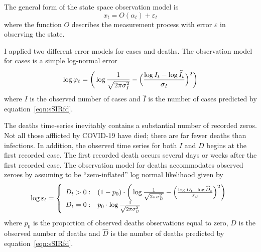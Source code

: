 \documentclass[12pt,letterpaper]{article}
\begin{document}
The general form of the state space observation model is
\begin{displaymath}
x_t = O(\alpha_t) + \varepsilon_t
\end{displaymath}
where the function $O$ describes the measurement process with
error $\varepsilon$ in observing the state.

I applied two different error models for cases and
deaths. The observation model for cases is a simple log-normal error
\begin{equation}
\log\varphi_t = \bigg(\log\frac{1}{\sqrt{2\pi\sigma^2_I}} -\Bigl(\frac{\log
I_t-\log\widehat{I}_t}{\sigma_I}\Bigr)^2\bigg)\\
\end{equation}
where $I$ is the observed number of cases and $\widehat{I}$ is the
number of cases predicted by equation~\ref{eqn:sSIRfd}.

The deaths time-series inevitably contains a
substantial number of recorded zeros. 
Not all those afflicted by COVID-19 have died; there are far fewer
deaths than infections. In addition,
the observed time series for both $I$ and $D$ begins at the first recorded
case. The first recorded death occurs several days or weeks after the
first recorded case. 
The observation model for deaths accommodates observed zeroes by
assuming to be ``zero-inflated'' log normal likelihood given by
\begin{equation}
  \log \varepsilon_t = \left\{
    \begin{array}{r@{\;:\quad}l}
       D_t > 0 &
(1-p_0)\cdot\bigg(\log\frac{1}{\sqrt{2\pi\sigma^2_D}}
          -\Bigl(\frac{\log D_t-\log\widehat{D}_t}{\sigma_D}\Bigr)^2\bigg)\\
       D_t = 0 & p_0 \cdot\log \frac{1}{\sqrt{2\pi\sigma^2_D}}\\
    \end{array}
  \right.
\end{equation}
where $p_0$ is the proportion of observed deaths observations equal to zero,
$D$ is the observed number of deaths and $\widehat{D}$ is the
number of deaths predicted by equation~\ref{eqn:sSIRfd}.
\end{document}
